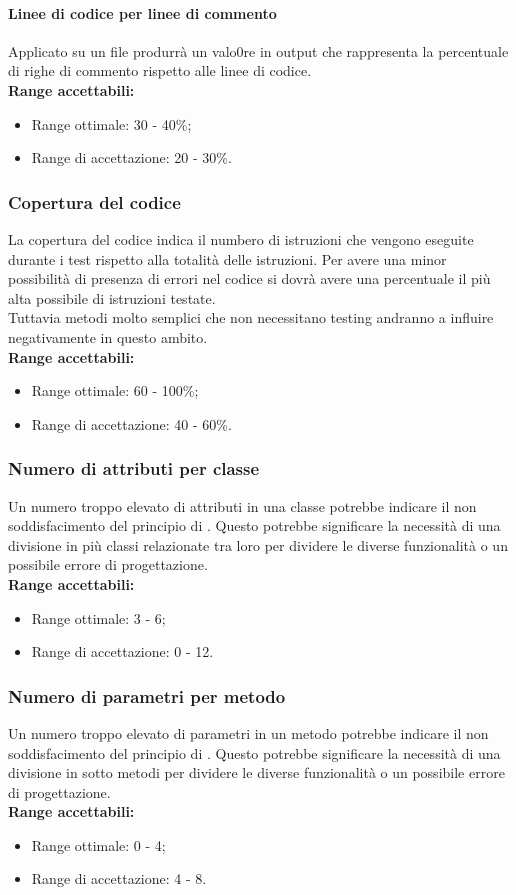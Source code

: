 \documentclass{scalatekids-article}
\begin{document}
\paragraph{Linee di codice per linee di commento}
Applicato su un file produrrà un valo0re in output che rappresenta la percentuale di righe di commento rispetto alle linee di codice.\\ 
\textbf{Range accettabili:}
\begin{itemize}
  \item Range ottimale: 30 - 40\%;
  \item Range di accettazione: 20 - 30\%.
\end{itemize}
\subsubsection{Copertura del codice}
La copertura del codice indica il numbero di istruzioni che vengono eseguite durante i test rispetto alla totalità delle istruzioni. Per avere una minor possibilità di presenza di errori nel codice si dovrà avere una percentuale il più alta possibile di istruzioni testate.\\Tuttavia metodi molto semplici che non necessitano testing andranno a influire negativamente in questo ambito.\\
\textbf{Range accettabili:}
\begin{itemize}
  \item Range ottimale: 60 - 100\%;
  \item Range di accettazione: 40 - 60\%.
\end{itemize}
\subsubsection{Numero di attributi per classe}
Un numero troppo elevato di attributi in una classe potrebbe indicare il non soddisfacimento del principio di \textit{}. Questo potrebbe significare la necessità di una divisione in più classi relazionate tra loro per dividere le diverse funzionalità o un possibile errore di progettazione.\\
\textbf{Range accettabili:}
\begin{itemize}
  \item Range ottimale: 3 - 6;
  \item Range di accettazione: 0 - 12.
\end{itemize}
\subsubsection{Numero di parametri per metodo}
Un numero troppo elevato di parametri in un metodo potrebbe indicare il non soddisfacimento del principio di \textit{}. Questo potrebbe significare la necessità di una divisione in sotto metodi per dividere le diverse funzionalità o un possibile errore di progettazione.\\
\textbf{Range accettabili:}
\begin{itemize}
  \item Range ottimale: 0 - 4;
  \item Range di accettazione: 4 - 8.
\end{itemize}
\end{document}
